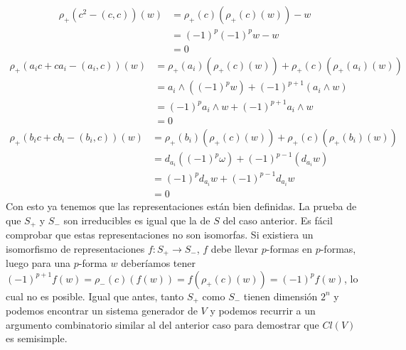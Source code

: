 \documentclass[twoside]{article}
\begin{document}
\begin{enumerate}
\begin{align*}
\rho_+(c^2 - ( c, c))(w)
&= \rho_+(c)(\rho_+(c)(w)) - w \\
&= (-1)^p(-1)^p w - w \\
&= 0
\end{align*}
\begin{align*}
\rho_+(a_i c + c a_i - ( a_i, c ))(w)
&= \rho_+(a_i)(\rho_+(c)(w)) + \rho_+(c)(\rho_+(a_i)(w)) \\
&= a_i \wedge ((-1)^p w) + (-1)^{p+1}(a_i \wedge w) \\
&= (-1)^p a_i \wedge w + (-1)^{p+1}a_i \wedge w \\
&= 0
\end{align*}
\begin{align*}
\rho_+(b_i c + c b_i - ( b_i, c ))(w)
&= \rho_+(b_i)(\rho_+(c)(w)) + \rho_+(c)(\rho_+(b_i)(w)) \\
&= d_{a_i}((-1)^p \omega) + (-1)^{p-1}(d_{a_i}w) \\
&= (-1)^pd_{a_i}w + (-1)^{p-1}d_{a_i}w \\
&= 0
\end{align*}
Con esto ya tenemos que las representaciones están bien definidas. La prueba de que $S_+$ y $S_-$ son irreducibles es igual que la de $S$ del caso anterior. Es fácil comprobar que estas representaciones no son isomorfas. Si existiera un isomorfismo de representaciones $f:S_+\to S_-$, $f$ debe llevar $p$-formas en $p$-formas, luego para una $p$-forma $w$ deberíamos tener $(-1)^{p+1}f(w)=\rho_-(c)(f(w))=f(\rho_+(c)(w))=(-1)^pf(w)$, lo cual no es posible. Igual que antes, tanto $S_+$ como $S_-$ tienen dimensión $2^n$ y podemos encontrar un sistema generador de $V$ y podemos recurrir a un argumento combinatorio similar al del anterior caso para demostrar que $Cl(V)$ es semisimple. 
\end{enumerate}
\end{document}
